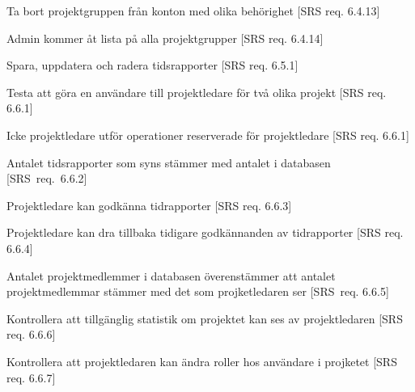 \documentclass[a4paper]{article}
\begin{document}
\begin{appendices}
\begin{FT}
Ta bort projektgruppen från konton med olika behörighet [SRS req. 6.4.13]

\item 

Admin kommer åt lista på alla projektgrupper [SRS req. 6.4.14]

\item 

Spara, uppdatera och radera tidsrapporter [SRS req. 6.5.1]

\item

Testa att göra en användare till projektledare för två olika projekt [SRS req. 6.6.1]

\item 

Icke projektledare utför operationer reserverade för projektledare [SRS req. 6.6.1]

\item

Antalet tidsrapporter som syns stämmer med antalet i databasen [SRS~req.~6.6.2]

\item 

Projektledare kan godkänna tidrapporter [SRS req. 6.6.3]

\item 

Projektledare kan dra tillbaka tidigare godkännanden av tidrapporter [SRS req. 6.6.4]

\item 

Antalet projektmedlemmer i databasen överenstämmer att antalet projektmedlemmar stämmer med det som projketledaren ser [SRS~req. 6.6.5]

\item 

Kontrollera att tillgänglig statistik om projektet kan ses av projektledaren [SRS req. 6.6.6]

\item 

Kontrollera att projektledaren kan ändra roller hos användare i projketet [SRS req. 6.6.7]






\end{FT}
\end{appendices}

\newpage
\end{document}
